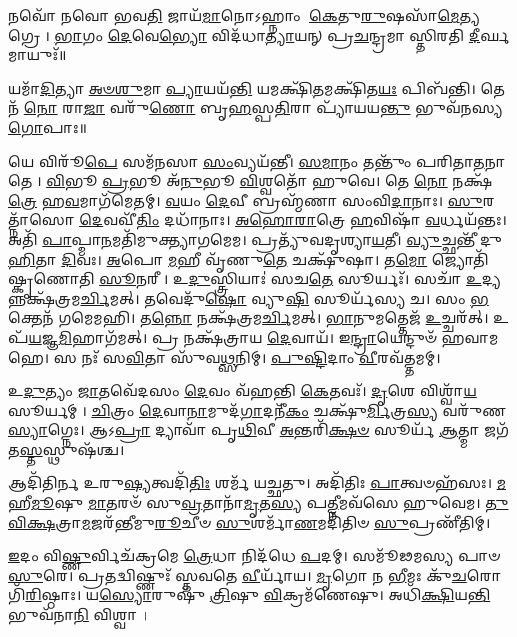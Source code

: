 \closesection


𑌨𑌵𑍋᳴ 𑌨𑌵𑍋 𑌭𑌵\-\ul{𑌤𑌿} 𑌜𑌾𑌯᳴\-\ul{𑌮𑌾}\-𑌨𑍋𑌽𑌹𑍍𑌨𑌾𑌂 \ul{𑌕𑍇}\-𑌤𑍁\-\ul{𑌰𑍁}\-𑌷𑌸𑌾᳴\-\ul{𑌮𑍇}\-𑌤𑍍𑌯𑌗𑍍𑌰𑍇।
\-\ul{𑌭𑌾}\-𑌗𑌂 \ul{𑌦𑍇}\-𑌵𑍇\-\ul{𑌭𑍍𑌯𑍋} 𑌵𑌿𑌦᳴𑌧𑌾\-\ul{𑌤𑍍𑌯𑌾}\-𑌯𑌨𑍍 𑌪𑍍𑌰\-\ul{𑌚}\-𑌨𑍍𑌦𑍍𑌰𑌮𑌾𑌸𑍍𑌤𑌿𑌰𑌤𑌿 \ul{𑌦𑍀}\-𑌰𑍍𑌘𑌮𑌾𑌯𑍁𑌃᳴॥

𑌯𑌮𑌾᳴\-\ul{𑌦𑌿}\-𑌤𑍍𑌯𑌾 \ul{𑌅}\-\-\ul{𑍞}\-\-\ul{𑌶𑍁}\-𑌮𑌾\-\ul{𑌪𑍍𑌯𑌾}\-𑌯𑌯᳴\-\ul{𑌨𑍍𑌤𑌿} 𑌯𑌮𑌕𑍍𑌷𑌿᳴\-\ul{𑌤}\-𑌮𑌕𑍍𑌷𑌿᳴𑌤\-\ul{𑌯𑌃} 𑌪𑌿𑌬᳴𑌨𑍍𑌤𑌿।
𑌤𑍇𑌨᳴ \ul{𑌨𑍋} 𑌰𑌾\-\ul{𑌜𑌾} 𑌵𑌰𑍁᳴\-\ul{𑌣𑍋} 𑌬𑍃\-\ul{𑌹}\-𑌸𑍍𑌪\-\ul{𑌤𑌿}\-𑌰𑌾 𑌪𑍍𑌯𑌾᳴𑌯𑌯\-\ul{𑌨𑍍𑌤𑍁} 𑌭𑍁𑌵᳴𑌨𑌸𑍍𑌯 \ul{𑌗𑍋}\-𑌪𑌾𑌃॥

𑌯𑍇 𑌵𑌿𑌰𑍂᳴\-\ul{𑌪𑍇} 𑌸𑌮᳴𑌨𑌸𑌾 \ul{𑌸𑌂}\-𑌵𑍍𑌯𑌯᳴𑌨𑍍𑌤𑍀। \ul{𑌸}\-\-\ul{𑌮𑌾}\-𑌨𑌂 𑌤𑌨𑍍𑌤𑍁𑌂᳴ 𑌪𑌰𑌿𑌤𑌾\-\ul{𑌤}\-𑌨𑌾𑌤𑍇।
\-\ul{𑌵𑌿}\-𑌭𑍂 \ul{𑌪𑍍𑌰}\-𑌭𑍂 𑌅᳴\-\ul{𑌨𑍁}\-𑌭𑍂 \ul{𑌵𑌿}\-𑌶𑍍𑌵𑌤𑍋᳴ 𑌹𑍁𑌵𑍇। 𑌤𑍇 \ul{𑌨𑍋} 𑌨𑌕𑍍𑌷᳴\-\ul{𑌤𑍍𑌰𑍇} 𑌹\-\ul{𑌵}\-𑌮𑌾𑌗᳴𑌮𑍇𑌤𑌮𑍍।
\-\ul{𑌵}\-𑌯𑌂 \ul{𑌦𑍇}\-𑌵𑍀 𑌬𑍍𑌰𑌹𑍍𑌮᳴𑌣𑌾 𑌸𑌂𑌵𑌿\-\ul{𑌦𑌾}\-𑌨𑌾𑌃। \ul{𑌸𑍁}\-𑌰𑌤𑍍𑌨𑌾᳴𑌸𑍋 \ul{𑌦𑍇}\-𑌵𑌵𑍀᳴\-\ul{𑌤𑌿𑌂} 𑌦𑌧𑌾᳴𑌨𑌾𑌃।
\-\ul{𑌅}\-\-\ul{𑌹𑍋}\-\-\ul{𑌰𑌾}\-𑌤𑍍𑌰𑍇 \ul{𑌹}\-𑌵𑌿𑌷𑌾᳴ \ul{𑌵}\-𑌰𑍍𑌧𑌯᳴𑌨𑍍𑌤𑌃। 𑌅𑌤𑌿᳴ \ul{𑌪𑌾}\-𑌪𑍍𑌮𑌾\-\ul{𑌨}\-𑌮𑌤𑌿᳴𑌮𑍁𑌕𑍍𑌤𑍍𑌯𑌾𑌗𑌮𑍇𑌮।
𑌪𑍍𑌰𑌤𑍍𑌯𑍁᳴𑌵𑌦𑍃𑌶𑍍𑌯𑌾\-\ul{𑌯}\-𑌤𑍀। \ul{𑌵𑍍𑌯𑍁}\-𑌚𑍍𑌛𑌨𑍍𑌤𑍀᳴ 𑌦𑍁\-\ul{𑌹𑌿}\-𑌤𑌾 \ul{𑌦𑌿}\-𑌵𑌃।
\-\ul{𑌅}\-𑌪𑍋 \ul{𑌮}\-𑌹𑍀 𑌵𑍃᳴𑌣𑍁\-\ul{𑌤𑍇} 𑌚𑌕𑍍𑌷𑍁᳴𑌷𑌾। 𑌤\-\ul{𑌮𑍋} 𑌜𑍍𑌯𑍋𑌤𑌿᳴𑌷𑍍𑌕𑍃𑌣𑍋𑌤𑌿 \ul{𑌸𑍂}\-𑌨𑌰𑍀।
𑌉\-\ul{𑌦𑍁}\-𑌸𑍍𑌤𑍍𑌰𑌿𑌯𑌾𑌃॑ 𑌸𑌚\-\ul{𑌤𑍇} 𑌸𑍂𑌰𑍍𑌯𑌃᳴। 𑌸𑌚𑌾᳴ \ul{𑌉}\-𑌦𑍍𑌯𑌨𑍍𑌨𑌕𑍍𑌷᳴𑌤𑍍𑌰𑌮\-\ul{𑌰𑍍𑌚𑌿}\-𑌮𑌤𑍍।
𑌤𑌵𑍇𑌦𑍁᳴\-\ul{𑌷𑍋} 𑌵𑍍𑌯𑍁\-\ul{𑌷𑌿} 𑌸𑍂𑌰𑍍𑌯᳴𑌸𑍍𑌯 𑌚। 𑌸𑌂 \ul{𑌭}\-𑌕𑍍𑌤𑍇𑌨᳴ 𑌗𑌮𑍇𑌮𑌹𑌿।
𑌤\-\ul{𑌨𑍍𑌨𑍋} 𑌨𑌕𑍍𑌷᳴𑌤𑍍𑌰𑌮\-\ul{𑌰𑍍𑌚𑌿}\-𑌮𑌤𑍍। \ul{𑌭𑌾}\-𑌨𑍁𑌮𑌤𑍍𑌤𑍇𑌜᳴ \ul{𑌉}\-𑌚𑍍𑌚𑌰᳴𑌤𑍍।
𑌉𑌪᳴\-\ul{𑌯}\-𑌜𑍍𑌞\-\ul{𑌮𑌿}\-𑌹𑌾𑌗᳴𑌮𑌤𑍍।
𑌪𑍍𑌰 𑌨𑌕𑍍𑌷᳴𑌤𑍍𑌰𑌾𑌯 \ul{𑌦𑍇}\-𑌵𑌾𑌯᳴। 𑌇\-\ul{𑌨𑍍𑌦𑍍𑌰𑌾}\-𑌯𑍇𑌨𑍍𑌦𑍁𑍞᳴ 𑌹𑌵𑌾𑌮𑌹𑍇।
𑌸 𑌨𑌃᳴ 𑌸\-\ul{𑌵𑌿}\-𑌤𑌾 𑌸𑍁᳴𑌵\-\ul{𑌥𑍍𑌸}\-𑌨𑌿𑌮𑍍। \ul{𑌪𑍁}\-\-\ul{𑌷𑍍𑌟𑌿}\-𑌦𑌾𑌂 \ul{𑌵𑍀}\-𑌰𑌵᳴𑌤𑍍𑌤𑌮𑌮𑍍।


𑌉\-\ul{𑌦𑍁}\-𑌤𑍍𑌯𑌂 \ul{𑌜𑌾}\-𑌤𑌵𑍇᳴𑌦𑌸𑌂 \ul{𑌦𑍇}\-𑌵𑌂 𑌵᳴𑌹𑌨𑍍𑌤𑌿 \ul{𑌕𑍇}\-𑌤𑌵𑌃᳴। \ul{𑌦𑍃}\-𑌶𑍇 𑌵𑌿𑌶𑍍𑌵𑌾᳴\-\ul{𑌯} 𑌸𑍂𑌰𑍍𑌯𑌮𑍍।
\-\ul{𑌚𑌿}\-𑌤𑍍𑌰𑌂 \ul{𑌦𑍇}\-𑌵𑌾\-\ul{𑌨𑌾}\-𑌮𑍁𑌦᳴\-\ul{𑌗𑌾}\-𑌦𑌨𑍀᳴\-\ul{𑌕𑌂} 𑌚𑌕𑍍𑌷𑍁᳴\-\ul{𑌰𑍍𑌮𑌿}\-𑌤𑍍𑌰\-\ul{𑌸𑍍𑌯} 𑌵𑌰𑍁᳴𑌣\-\ul{𑌸𑍍𑌯𑌾}\-𑌗𑍍𑌨𑍇𑌃।
𑌆𑌽\-\ul{𑌪𑍍𑌰𑌾} 𑌦𑍍𑌯𑌾𑌵𑌾᳴ 𑌪𑍃\-\ul{𑌥𑌿}\-𑌵𑍀 \ul{𑌅}\-𑌨𑍍𑌤𑌰𑌿᳴\-\ul{𑌕𑍍𑌷}\-\-\ul{𑍞} 𑌸𑍂𑌰𑍍𑌯᳴ \ul{𑌆}\-𑌤𑍍𑌮𑌾 𑌜𑌗᳴𑌤\-\ul{𑌸𑍍𑌤}\-𑌸𑍍𑌥𑍁𑌷᳴𑌶𑍍𑌚।


𑌆𑌦𑌿᳴𑌤𑌿𑌰𑍍𑌨 𑌉𑌰𑍁\-\ul{𑌷𑍍𑌯}\-𑌤𑍍𑌵𑌦𑌿᳴\-\ul{𑌤𑌿𑌃} 𑌶𑌰𑍍𑌮᳴ 𑌯𑌚𑍍𑌛𑌤𑍁। 𑌅𑌦𑌿᳴𑌤𑌿𑌃 \ul{𑌪𑌾}\-𑌤𑍍𑌵𑍞𑌹᳴𑌸𑌃।
\-\ul{𑌮}\-𑌹𑍀\-\ul{𑌮𑍂}\-𑌷𑍁 \ul{𑌮𑌾}\-𑌤𑌰𑍞᳴ 𑌸𑍁\-\ul{𑌵𑍍𑌰}\-𑌤𑌾𑌨𑌾᳴\-\ul{𑌮𑍃}\-𑌤\-\ul{𑌸𑍍𑌯} 𑌪\-\ul{𑌤𑍍𑌨𑍀}\-𑌮𑌵᳴𑌸𑍇 𑌹𑍁𑌵𑍇𑌮।
\-\ul{𑌤𑍁}\-\-\ul{𑌵𑌿}\-\-\ul{𑌕𑍍𑌷}\-𑌤𑍍𑌰𑌾\-\ul{𑌮}\-𑌜𑌰᳴𑌨𑍍𑌤𑍀𑌮𑍁\-\ul{𑌰𑍂}\-𑌚𑍀𑍞 \ul{𑌸𑍁}\-𑌶𑌰𑍍𑌮𑌾᳴\-\ul{𑌣}\-\-𑌮𑌦𑌿᳴𑌤𑌿𑍞 \ul{𑌸𑍁}\-𑌪𑍍𑌰𑌣𑍀᳴𑌤𑌿𑌮𑍍।


\-\ul{𑌇}\-𑌦𑌂 𑌵𑌿\-\ul{𑌷𑍍𑌣𑍁}\-𑌰𑍍𑌵𑌿𑌚᳴𑌕𑍍𑌰𑌮𑍇 \ul{𑌤𑍍𑌰𑍇}\-𑌧𑌾 𑌨𑌿𑌦᳴𑌧𑍇 \ul{𑌪}\-𑌦𑌮𑍍। 𑌸𑌮𑍂᳴𑌢𑌮𑌸𑍍𑌯 𑌪𑌾𑍞\-\ul{𑌸𑍁}\-𑌰𑍇।
𑌪𑍍𑌰𑌤𑌦𑍍𑌵𑌿𑌷𑍍𑌣𑍁𑌃᳴ 𑌸𑍍𑌤𑌵𑌤𑍇 \ul{𑌵𑍀}\-𑌰𑍍𑌯𑌾᳴𑌯। \ul{𑌮𑍃}\-𑌗𑍋 𑌨 \ul{𑌭𑍀}\-𑌮𑌃 𑌕𑍁᳴\-\ul{𑌚}\-𑌰𑍋 𑌗𑌿᳴\-\ul{𑌰𑌿}\-𑌷𑍍𑌠𑌾𑌃।
𑌯\-\ul{𑌸𑍍𑌯𑍋}\-𑌰𑍁𑌷𑍁᳴ \ul{𑌤𑍍𑌰𑌿}\-𑌷𑍁 \ul{𑌵𑌿}\-𑌕𑍍𑌰𑌮᳴𑌣𑍇𑌷𑍁। 𑌅𑌧𑌿᳴\-\ul{𑌕𑍍𑌷𑌿}\-𑌯\-\ul{𑌨𑍍𑌤𑌿} 𑌭𑍁𑌵᳴𑌨𑌾\-\ul{𑌨𑌿} 𑌵𑌿𑌶𑍍𑌵𑌾।

